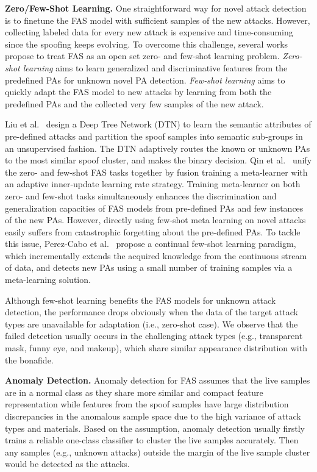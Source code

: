 \documentclass[10pt,journal,compsoc]{IEEEtran}
\begin{document}
\vspace{0.4em}
\noindent\textbf{Zero/Few-Shot Learning.}\quad   
One straightforward way for novel attack detection is to finetune the FAS model with sufficient samples of the new attacks. However, collecting labeled data for every new attack is expensive and time-consuming since the spoofing keeps evolving. To overcome this challenge, several works~\cite{liu2019deep,qin2019learning,perez2020learning} propose to treat FAS as an open set zero- and few-shot learning problem. \textit{Zero-shot learning} aims to learn generalized and discriminative features from the predefined PAs for unknown novel PA detection. \textit{Few-shot learning} aims to quickly adapt the FAS model to new attacks by learning from both the predefined PAs and the collected very few samples of the new attack. 


Liu et al.~\cite{liu2019deep} design a Deep Tree Network (DTN) to learn the semantic attributes of pre-defined attacks and partition the spoof samples into semantic sub-groups in an unsupervised fashion. The DTN adaptively routes the known or unknown PAs to the most similar spoof cluster, and makes the binary decision. Qin et al.~\cite{qin2019learning} unify the zero- and few-shot FAS tasks together by fusion training a meta-learner with an adaptive inner-update learning rate strategy. Training meta-learner on both zero- and few-shot tasks simultaneously enhances the discrimination and generalization capacities of FAS models from pre-defined PAs and few instances of the new PAs. However, directly using few-shot meta learning on novel attacks easily suffers from catastrophic forgetting about the pre-defined PAs. To tackle this issue, Perez-Cabo et al.~\cite{perez2020learning} propose a continual few-shot learning paradigm, which incrementally extends the acquired knowledge from the continuous stream of data, and detects new PAs using a small number of training samples via a meta-learning solution. 


Although few-shot learning benefits the FAS models for unknown attack detection, the performance drops obviously when the data of the target attack types are unavailable for adaptation (i.e., zero-shot case). We observe that the failed detection usually occurs in the challenging attack types (e.g., transparent mask, funny eye, and makeup), which share similar appearance distribution with the bonafide. 


\vspace{0.4em}
\noindent\textbf{Anomaly Detection.}\quad   
Anomaly detection for FAS assumes that the live samples are in a normal class as they share more similar and compact feature representation while features from the spoof samples have large distribution discrepancies in the anomalous sample space due to the high variance of attack types and materials. Based on the assumption, anomaly detection usually firstly trains a reliable one-class classifier to cluster the live samples accurately. Then any samples (e.g., unknown attacks) outside the margin of the live sample cluster would be detected as the attacks.
\end{document}
